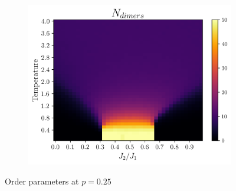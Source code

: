 \documentclass[../thesis_main.tex]{subfiles}
\begin{document}
\begin{figure}[!htb]
\begin{subfigure}[b]{0.43\textwidth}
        \centering
        \includegraphics[width=\textwidth]{images/j1-j2/phase_diagrams/p=0.25/N_dimers_p=0.25.png}
    \end{subfigure}
    \caption{Order parameters at $p = 0.25$}
    \label{p=0.25}
\end{figure}
\FloatBarrier
\end{document}
